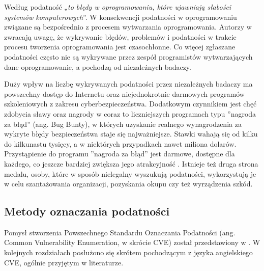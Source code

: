 \bigbreak
Według \cite{jukka2019look} podatność „\emph{to błędy w oprogramowaniu, które ujawniają słabości systemów komputerowych}”. W konsekwencji podatności w oprogramowaniu związane są bezpośrednio z procesem wytwarzania oprogramowania. Autorzy w \cite{morrison2018vulnerabilities} zwracają uwagę, że wykrywanie błędów, problemów i podatności w trakcie procesu tworzenia oprogramowania jest czasochłonne. Co więcej zgłaszane podatności często nie są wykrywane przez zespół programistów wytwarzających dane oprogramowanie, a pochodzą od niezależnych badaczy. 

\bigbreak
Duży wpływ na liczbę wykrywanych podatności przez niezależnych badaczy ma powszechny dostęp do Internetu oraz niejednokrotnie darmowych programów szkoleniowych z zakresu cyberbezpieczeństwa. Dodatkowym czynnikiem jest chęć zdobycia sławy oraz nagrody w coraz to liczniejszych programach typu ''nagroda za błąd'' (ang. Bug Bunty), w których uzyskanie realnego wynagrodzenia za wykryte błędy bezpieczeństwa staje się najważniejsze. Stawki wahają się od kilku do kilkunastu tysięcy, a w niektórych przypadkach nawet miliona dolarów. Przystąpienie do programu ''nagroda za błąd'' jest darmowe, dostępne dla każdego, co jeszcze bardziej zwiększa jego atrakcyjność \cite{malladi2019bug}. Istnieje też druga strona medalu, osoby, które w sposób nielegalny wyszukują podatności, wykorzystują je w celu szantażowania organizacji, pozyskania okupu czy też wyrządzenia szkód.
\FloatBarrier

\subsection{Metody oznaczania podatności}
Pomysł stworzenia Powszechnego Standardu Oznaczania Podatności (ang. Common Vulnerability Enumeration, w skrócie CVE) został przedstawiony w \cite{mann1999towards}. W kolejnych rozdziałach posłużono się skrótem pochodzącym z języka angielskiego CVE, ogólnie przyjętym w literaturze.

